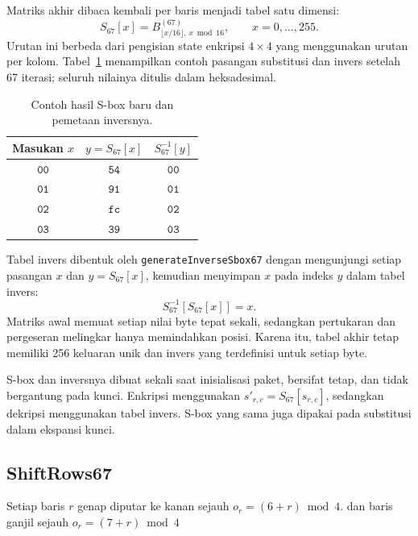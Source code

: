 Matriks akhir dibaca kembali per baris menjadi tabel satu dimensi:
\begin{equation}
  S_{67}[x]=B^{(67)}_{\lfloor x/16\rfloor,\,x\bmod16},
  \qquad x=0,\ldots,255.
\end{equation}
Urutan ini berbeda dari pengisian state enkripsi $4\times4$ yang
menggunakan urutan per kolom. Tabel~\ref{tab:pembentukan-sbox}
menampilkan contoh pasangan substitusi dan invers setelah 67 iterasi;
seluruh nilainya ditulis dalam heksadesimal.
\begin{table}[htbp]
  \centering
  \caption{Contoh hasil S-box baru dan pemetaan inversnya.}
  \label{tab:pembentukan-sbox}
  \begin{tabular}{@{}ccc@{}}
    \toprule Masukan $x$ & $y=S_{67}[x]$ & $S_{67}^{-1}[y]$\\ \midrule
    $\mathtt{00}$ & $\mathtt{54}$ & $\mathtt{00}$\\
    $\mathtt{01}$ & $\mathtt{91}$ & $\mathtt{01}$\\
    $\mathtt{02}$ & $\mathtt{fc}$ & $\mathtt{02}$\\
    $\mathtt{03}$ & $\mathtt{39}$ & $\mathtt{03}$\\
    \bottomrule
  \end{tabular}
\end{table}

Tabel invers dibentuk oleh \texttt{generateInverseSbox67} dengan
mengunjungi setiap pasangan $x$ dan $y=S_{67}[x]$, kemudian menyimpan
$x$ pada indeks $y$ dalam tabel invers:
\begin{equation}
  S_{67}^{-1}[S_{67}[x]]=x.
\end{equation}
Matriks awal memuat setiap nilai byte tepat sekali, sedangkan pertukaran
dan pergeseran melingkar hanya memindahkan posisi. Karena itu, tabel
akhir tetap memiliki 256 keluaran unik dan invers yang terdefinisi untuk
setiap byte.

S-box dan inversnya dibuat sekali saat inisialisasi paket, bersifat tetap,
dan tidak bergantung pada kunci. Enkripsi menggunakan
$s'_{r,c}=S_{67}[s_{r,c}]$, sedangkan dekripsi menggunakan tabel invers.
S-box yang sama juga dipakai pada substitusi dalam ekspansi kunci.


\subsection{ShiftRows67}
Setiap baris $r$ genap diputar ke kanan sejauh $o_r=(6+r)\bmod4$. dan baris ganjil sejauh $o_r=(7+r)\bmod4$

